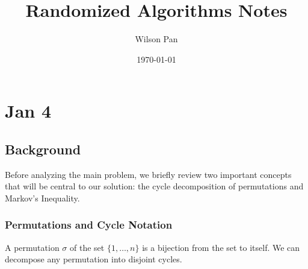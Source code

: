 \documentclass[a4paper]{article}
\title{Randomized Algorithms Notes}
\author{Wilson Pan}
\date{\today}
\begin{document}
\maketitle
\tableofcontents
\newpage
\section{Jan 4}
\subsection{Background}

Before analyzing the main problem, we briefly review two important concepts that will be central to our solution: the cycle decomposition of permutations and Markov's Inequality.

\subsubsection{Permutations and Cycle Notation}
A permutation $\sigma$ of the set $\{1, \dots, n\}$ is a bijection from the set to itself. We can decompose any permutation into disjoint cycles.
\end{document}
